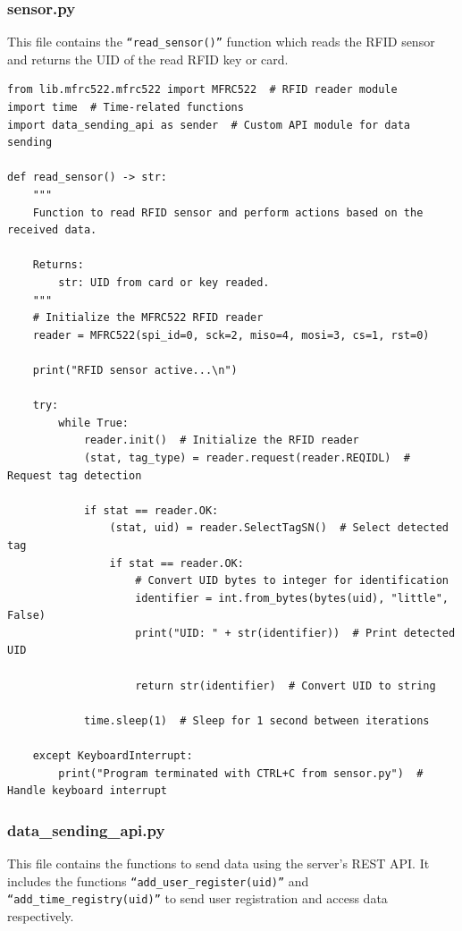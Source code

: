\documentclass{article}
\begin{document}
\subsubsection{sensor.py}
This file contains the \texttt{``read\_sensor()''} function which reads the RFID sensor and returns the UID of the read RFID key or card.
\begin{lstlisting}
from lib.mfrc522.mfrc522 import MFRC522  # RFID reader module
import time  # Time-related functions
import data_sending_api as sender  # Custom API module for data sending

def read_sensor() -> str:
    """
    Function to read RFID sensor and perform actions based on the received data.

    Returns:
        str: UID from card or key readed.
    """
    # Initialize the MFRC522 RFID reader
    reader = MFRC522(spi_id=0, sck=2, miso=4, mosi=3, cs=1, rst=0)

    print("RFID sensor active...\n")

    try:
        while True:
            reader.init()  # Initialize the RFID reader
            (stat, tag_type) = reader.request(reader.REQIDL)  # Request tag detection

            if stat == reader.OK:
                (stat, uid) = reader.SelectTagSN()  # Select detected tag
                if stat == reader.OK:
                    # Convert UID bytes to integer for identification
                    identifier = int.from_bytes(bytes(uid), "little", False)
                    print("UID: " + str(identifier))  # Print detected UID

                    return str(identifier)  # Convert UID to string
                
            time.sleep(1)  # Sleep for 1 second between iterations

    except KeyboardInterrupt:
        print("Program terminated with CTRL+C from sensor.py")  # Handle keyboard interrupt
\end{lstlisting}

\subsubsection{data\_sending\_api.py}
This file contains the functions to send data using the server's REST API.
It includes the functions \texttt{``add\_user\_register(uid)''} and \texttt{``add\_time\_registry(uid)''} to send user registration and access data respectively.
\end{document}
